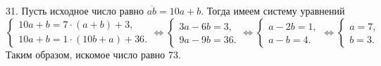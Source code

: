 31. Пусть исходное число равно $\overline{ab}=10a+b.$ Тогда имеем систему уравнений \\$\begin{cases} 10a+b=7\cdot(a+b)+3,\\ 10a+b=1\cdot(10b+a)+36.\end{cases}\Leftrightarrow \begin{cases} 3a-6b=3,\\ 9a-9b=36.\end{cases}\Leftrightarrow \begin{cases} a-2b=1,\\ a-b=4.\end{cases}
\Leftrightarrow \begin{cases} a=7,\\ b=3.\end{cases}$ Таким образом, искомое число равно 73.\\
